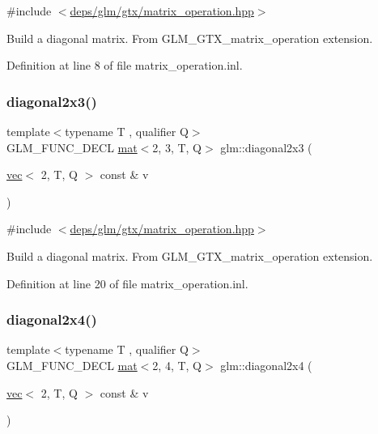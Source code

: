 {\ttfamily \#include $<$\hyperlink{matrix__operation_8hpp}{deps/glm/gtx/matrix\+\_\+operation.\+hpp}$>$}

Build a diagonal matrix. From G\+L\+M\+\_\+\+G\+T\+X\+\_\+matrix\+\_\+operation extension. 

Definition at line 8 of file matrix\+\_\+operation.\+inl.

\mbox{\label{group__gtx__matrix__operation_gab69f900206a430e2875a5a073851e175}} 
\subsubsection{\texorpdfstring{diagonal2x3()}{diagonal2x3()}}
{\footnotesize\ttfamily template$<$typename T , qualifier Q$>$ \\
G\+L\+M\+\_\+\+F\+U\+N\+C\+\_\+\+D\+E\+CL \hyperlink{structglm_1_1mat}{mat}$<$2, 3, T, Q$>$ glm\+::diagonal2x3 (\begin{DoxyParamCaption}\item[{\hyperlink{structglm_1_1vec}{vec}$<$ 2, T, Q $>$ const \&}]{v }\end{DoxyParamCaption})}



{\ttfamily \#include $<$\hyperlink{matrix__operation_8hpp}{deps/glm/gtx/matrix\+\_\+operation.\+hpp}$>$}

Build a diagonal matrix. From G\+L\+M\+\_\+\+G\+T\+X\+\_\+matrix\+\_\+operation extension. 

Definition at line 20 of file matrix\+\_\+operation.\+inl.

\mbox{\label{group__gtx__matrix__operation_ga30b4dbfed60a919d66acc8a63bcdc549}} 
\subsubsection{\texorpdfstring{diagonal2x4()}{diagonal2x4()}}
{\footnotesize\ttfamily template$<$typename T , qualifier Q$>$ \\
G\+L\+M\+\_\+\+F\+U\+N\+C\+\_\+\+D\+E\+CL \hyperlink{structglm_1_1mat}{mat}$<$2, 4, T, Q$>$ glm\+::diagonal2x4 (\begin{DoxyParamCaption}\item[{\hyperlink{structglm_1_1vec}{vec}$<$ 2, T, Q $>$ const \&}]{v }\end{DoxyParamCaption})}



